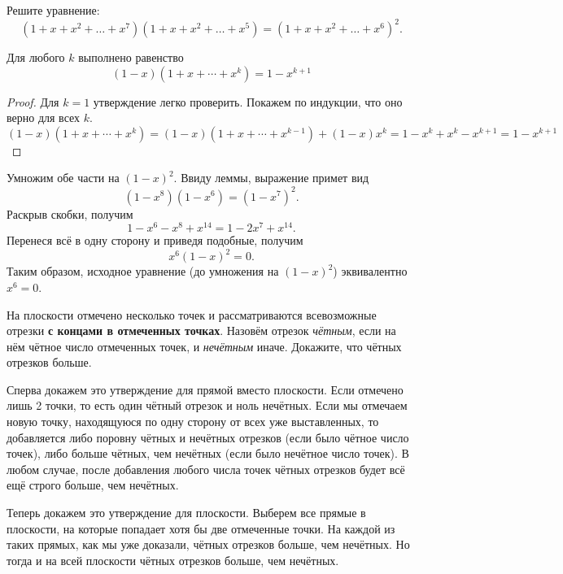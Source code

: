 \documentclass[a4paper,12pt]{article}
\begin{document}
    \problem Решите уравнение:
    \begin{equation*}
        (1 + x + x^2 + \ldots + x^7) (1 + x + x^2 + \ldots + x^5) = (1 + x + x^2 + \ldots + x^6)^2.
    \end{equation*}
    \begin{solution}
        \begin{lemma}
            Для любого $k$ выполнено равенство
            \begin{equation*}
                (1 - x)(1 + x + \cdots + x^k) = 1 - x^{k + 1}
            \end{equation*}
        \end{lemma}
        \begin{proof}
            Для $k = 1$ утверждение легко проверить. Покажем по индукции, что оно верно для всех $k$.
            \begin{equation*}
                (1 - x)(1 + x + \cdots + x^k) = (1 - x)(1 + x + \cdots + x^{k-1}) + (1 - x)x^k = 1 - x^k + x^k - x^{k+1} = 1 - x^{k+1}
            \end{equation*}
        \end{proof}
        Умножим обе части на $(1 - x)^2$. Ввиду леммы, выражение примет вид
        \begin{equation*}
            (1 - x^8)(1 - x^6) = (1 - x^7)^2.
        \end{equation*}
        Раскрыв скобки, получим
        \begin{equation*}
            1 - x^6 - x^8 + x^{14} = 1 - 2x^7 + x^{14}.
        \end{equation*}
        Перенеся всё в одну сторону и приведя подобные, получим
        \begin{equation*}
            x^6(1 - x)^2 = 0.
        \end{equation*}
        Таким образом, исходное уравнение (до умножения на $(1 - x)^2$) эквивалентно $x^6 = 0$.
    \end{solution}
    \problem На плоскости отмечено несколько точек и рассматриваются всевозможные отрезки \textbf{с концами в отмеченных точках}. Назовём отрезок \emph{чётным}, если на нём чётное число отмеченных точек, и \emph{нечётным} иначе. Докажите, что чётных отрезков больше.
    \begin{solution}
        Сперва докажем это утверждение для прямой вместо плоскости. Если отмечено лишь 2 точки, то есть один чётный отрезок и ноль нечётных. Если мы отмечаем новую точку, находящуюся по одну сторону от всех уже выставленных, то добавляется либо поровну чётных и нечётных отрезков (если было чётное число точек), либо больше чётных, чем нечётных (если было нечётное число точек). В любом случае, после добавления любого числа точек чётных отрезков будет всё ещё строго больше, чем нечётных. \par
        Теперь докажем это утверждение для плоскости. Выберем все прямые в плоскости, на которые попадает хотя бы две отмеченные точки. На каждой из таких прямых, как мы уже доказали, чётных отрезков больше, чем нечётных. Но тогда и на всей плоскости чётных отрезков больше, чем нечётных.
    \end{solution}
\end{document}
